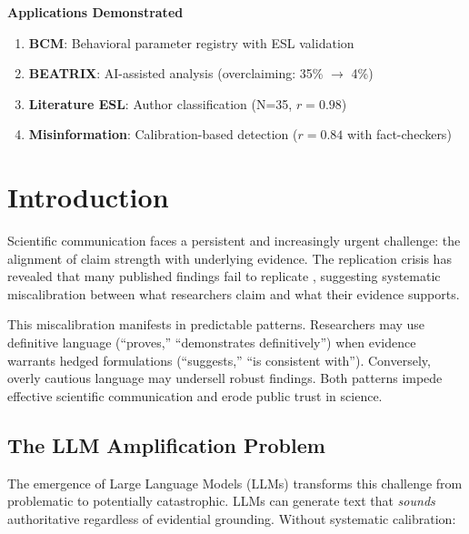 \documentclass[11pt,a4paper]{article}
\begin{document}
\begin{center}
{{\vspace{0.5em}
\textbf{Applications Demonstrated}
\begin{enumerate}[noitemsep, topsep=0pt]
    \item \textbf{BCM}: Behavioral parameter registry with ESL validation
    \item \textbf{BEATRIX}: AI-assisted analysis (overclaiming: 35\% $\to$ 4\%)
    \item \textbf{Literature ESL}: Author classification (N=35, $r=0.98$)
    \item \textbf{Misinformation}: Calibration-based detection ($r=0.84$ with fact-checkers)
\end{enumerate}
}}
\end{center}

\newpage

\section{Introduction}
\label{sec:introduction}


Scientific communication faces a persistent and increasingly urgent challenge: the alignment of claim strength with underlying evidence. The replication crisis has revealed that many published findings fail to replicate \citep{OpenScienceCollaboration2015, Camerer2016, Camerer2018}, suggesting systematic miscalibration between what researchers claim and what their evidence supports.

This miscalibration manifests in predictable patterns. Researchers may use definitive language (``proves,'' ``demonstrates definitively'') when evidence warrants hedged formulations (``suggests,'' ``is consistent with''). Conversely, overly cautious language may undersell robust findings. Both patterns impede effective scientific communication and erode public trust in science.

\subsection{The LLM Amplification Problem}

The emergence of Large Language Models (LLMs) transforms this challenge from problematic to potentially catastrophic. LLMs can generate text that \textit{sounds} authoritative regardless of evidential grounding. Without systematic calibration:
\end{document}

